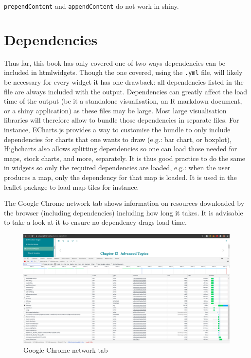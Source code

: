 \documentclass[
]{krantz}
\makeatletter
\newenvironment{kframe}{%
\medskip{}
\setlength{\fboxsep}{.8em}
 \def\at@end@of@kframe{}%
 \ifinner\ifhmode%
  \def\at@end@of@kframe{\end{minipage}}%
  \begin{minipage}{\columnwidth}%
 \fi\fi%
 \def\FrameCommand##1{\hskip\@totalleftmargin \hskip-\fboxsep
 \colorbox{shadecolor}{##1}\hskip-\fboxsep
     \hskip-\linewidth \hskip-\@totalleftmargin \hskip\columnwidth}%
 \MakeFramed {\advance\hsize-\width
   \@totalleftmargin\z@ \linewidth\hsize
   \@setminipage}}%
 {\par\unskip\endMakeFramed%
 \at@end@of@kframe}
\newenvironment{rmdblock}[1]
  {
  \begin{itemize}
  \renewcommand{\labelitemi}{
    \raisebox{-.7\height}[0pt][0pt]{
      {\setkeys{Gin}{width=3em,keepaspectratio}\texttt{[image: images/\#1]}}
    }
  }
  \setlength{\fboxsep}{1em}
  \begin{kframe}
  \item
  }
  {
  \end{kframe}
  \end{itemize}
  }
\newenvironment{rmdnote}
  {\begin{rmdblock}{note}}
  {\end{rmdblock}}
\makeatother
\begin{document}
\begin{rmdnote}
\texttt{prependContent} and \texttt{appendContent} do not work in shiny.
\end{rmdnote}

\hypertarget{dependencies}{%
\section{Dependencies}\label{dependencies}}

Thus far, this book has only covered one of two ways dependencies can be included in htmlwidgets. Though the one covered, using the \texttt{.yml} file, will likely be necessary for every widget it has one drawback: all dependencies listed in the file are always included with the output. Dependencies can greatly affect the load time of the output (be it a standalone visualisation, an R markdown document, or a shiny application) as these files may be large. Most large visualisation libraries will therefore allow to bundle those dependencies in separate files. For instance, ECharts.js provides a way to customise the bundle to only include dependencies for charts that one wants to draw (e.g.: bar chart, or boxplot), Highcharts also allows splitting dependencies so one can load those needed for maps, stock charts, and more, separately. It is thus good practice to do the same in widgets so only the required dependencies are loaded, e.g.: when the user produces a map, only the dependency for that map is loaded. It is used in the leaflet package to load map tiles for instance.

The Google Chrome network tab shows information on resources downloaded by the browser (including dependencies) including how long it takes. It is advisable to take a look at it to ensure no dependency drags load time.

\begin{figure}
\centering
\includegraphics{images/htmlwidgets-performances.png}
\caption{Google Chrome network tab}
\end{figure}
\end{document}
